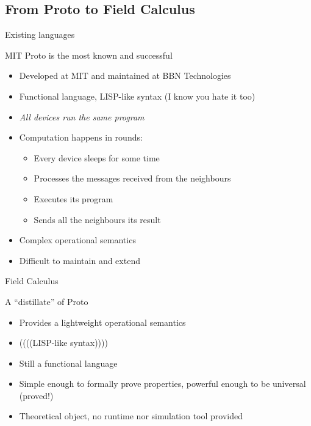 \documentclass[presentation]{beamer} %
\begin{document}
\subsection{From Proto to Field Calculus}

\begin{frame}[fragile]{Existing languages}
  \begin{block} {MIT Proto \cite{proto} is the most known and successful}
   \begin{itemize}
    \item Developed at MIT and maintained at BBN Technologies
    \item Functional language, LISP-like syntax (I know you hate it too)
    \item \emph{All devices run the same program}
    \item Computation happens in rounds:
    \begin{itemize}
      \item Every device sleeps for some time
      \item Processes the messages received from the neighbours
      \item Executes its program
      \item Sends all the neighbours its result
    \end{itemize}
    \item Complex operational semantics
    \item Difficult to maintain and extend 
   \end{itemize}
  \end{block}
\end{frame}

\begin{frame}[fragile]{Field Calculus}
  \begin{block} {A ``distillate'' of Proto}
   \begin{itemize}
    \item Provides a lightweight operational semantics \cite{VDB-FOCLASA-CIC2013}
    \item ((((LISP-like syntax))))
    \item Still a functional language
    \item Simple enough to formally prove properties, powerful enough to be universal (proved!)
    \item Theoretical object, no runtime nor simulation tool provided
   \end{itemize}
  \end{block}
\end{frame}
\end{document}

